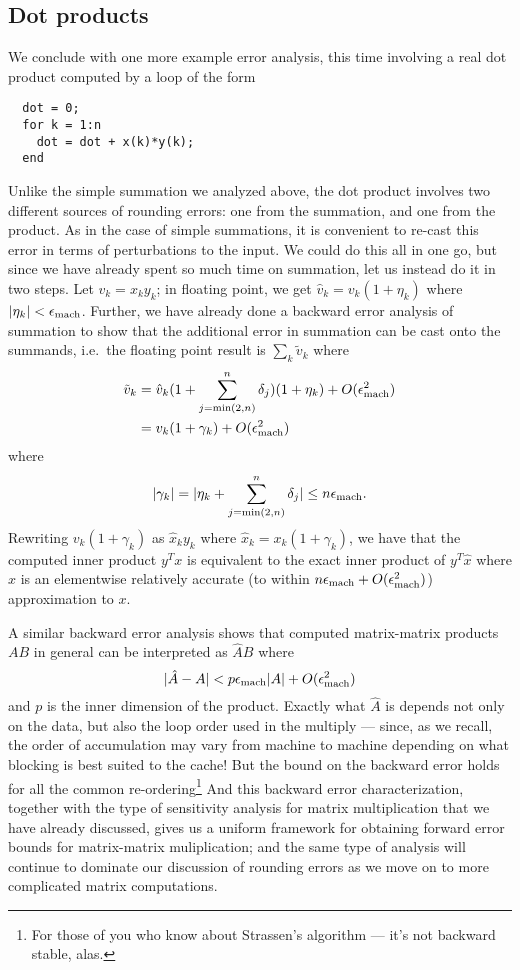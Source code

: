 \documentclass[12pt, leqno]{article} %
\begin{document}
\subsection{Dot products}

We conclude with one more example error analysis, this time involving
a real dot product computed by a loop of the form
\begin{lstlisting}
  dot = 0;
  for k = 1:n
    dot = dot + x(k)*y(k);
  end
\end{lstlisting}
Unlike the simple summation we analyzed above, the dot product involves
two different sources of rounding errors: one from the summation,
and one from the product.  As in the case of simple summations, it is
convenient to re-cast this error in terms of perturbations to the input.
We could do this all in one go, but since we have already spent so much
time on summation, let us instead do it in two steps.  Let $v_k = x_k y_k$;
in floating point, we get $\hat{v}_k = v_k (1+\eta_k)$
where $|\eta_k| < \epsilon_{\mathrm{mach}}$.  Further,
we have already done a backward error analysis of summation to show
that the additional error in summation can be cast onto the summands,
i.e.~the floating point result is $\sum_k \tilde{v}_k$ where
\begin{align*}
  \tilde{v}_k
  &= \hat{v}_k (1 + \sum_{j=\min(2,n)}^n \delta_j) (1 + \eta_k) + O(\epsilon_{\mathrm{mach}}^2) \\
  &= v_k (1+\gamma_k) + O(\epsilon_{\mathrm{mach}}^2)
\end{align*}
where
\[
  |\gamma_k| = |\eta_k + \sum_{j=\min(2,n)}^n \delta_j| \leq n \epsilon_{\mathrm{mach}}.
\]
Rewriting $v_k(1+\gamma_k)$ as $\hat{x}_k y_k$ where
$\hat{x}_k = x_k (1+\gamma_k)$, we have that the computed inner
product $y^T x$ is equivalent to the exact inner product of $y^T \hat{x}$
where $\hat{x}$ is an elementwise relatively accurate
(to within $n \epsilon_{\mathrm{mach}} + O(\epsilon_{\mathrm{mach}}^2)$) approximation to $x$.

A similar backward error analysis shows that computed matrix-matrix
products $AB$ in general can be interpreted as $\hat{A} B$ where
\[
  |\hat{A}-A| < p \epsilon_{\mathrm{mach}} |A| + O(\epsilon_{\mathrm{mach}}^2)
\]
and $p$ is the inner dimension of the product.  Exactly what $\hat{A}$
is depends not only on the data, but also the loop order used in the
multiply --- since, as we recall, the order of accumulation may vary
from machine to machine depending on what blocking is best suited to
the cache!  But the bound on the backward error holds for all the common
re-ordering\footnote{%
For those of you who know about Strassen's algorithm --- it's not
backward stable, alas.
}
And this backward error characterization, together with the
type of sensitivity analysis for matrix multiplication that we have
already discussed, gives us a uniform framework for obtaining
forward error bounds for matrix-matrix muliplication; and the same
type of analysis will continue to dominate our discussion of rounding
errors as we move on to more complicated matrix computations.
\end{document}
